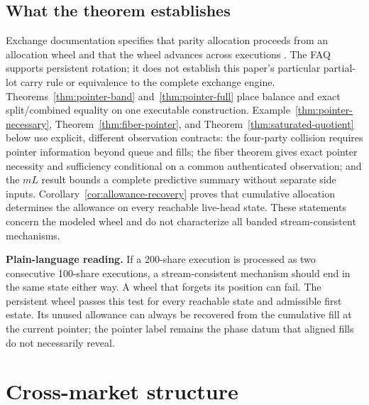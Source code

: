 \documentclass[11pt]{article}
\theoremstyle{definition}
\theoremstyle{remark}
\newcommand{\plain}[1]{\par\smallskip\noindent\textcolor{blue!50!black}{\textbf{Plain-language reading.}} #1\par\smallskip}
\begin{document}
\subsection{What the theorem establishes}
Exchange documentation specifies that parity allocation proceeds from an allocation wheel and that the wheel advances across executions \citep[questions 7--8]{nyse2024parity}. The FAQ supports persistent rotation; it does not establish this paper's particular partial-lot carry rule or equivalence to the complete exchange engine. Theorems~\ref{thm:pointer-band} and~\ref{thm:pointer-full} place balance and exact split/combined equality on one executable construction. Example~\ref{thm:pointer-necessary}, Theorem~\ref{thm:fiber-pointer}, and Theorem~\ref{thm:saturated-quotient} below use explicit, different observation contracts: the four-party collision requires pointer information beyond queue and fills; the fiber theorem gives exact pointer necessity and sufficiency conditional on a common authenticated observation; and the $mL$ result bounds a complete predictive summary without separate side inputs. Corollary~\ref{cor:allowance-recovery} proves that cumulative allocation determines the allowance on every reachable live-head state. These statements concern the modeled wheel and do not characterize all banded stream-consistent mechanisms.

\plain{If a 200-share execution is processed as two consecutive 100-share executions, a stream-consistent mechanism should end in the same state either way. A wheel that forgets its position can fail. The persistent wheel passes this test for every reachable state and admissible first estate. Its unused allowance can always be recovered from the cumulative fill at the current pointer; the pointer label remains the phase datum that aligned fills do not necessarily reveal.}

\section{Cross-market structure}\label{sec:cross}
\end{document}
